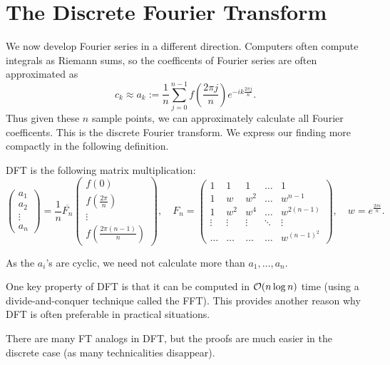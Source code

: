 \section{The Discrete Fourier Transform}
We now develop Fourier series in a different direction. Computers often compute integrals as Riemann sums, so the coefficents of Fourier series are often approximated as
\[
    c_k \approx a_k := \frac{1}{n} \sum^{n-1}_{j=0} f( \frac{2\pi j}{n}) e^{-ik \frac{2\pi j}{n}}.
\]
Thus given these $n$ sample points, we can approximately calculate all Fourier coefficents. This is the discrete Fourier transform. We express our finding more compactly in the following definition.
\begin{dfn}
    DFT is the following matrix multiplication:
    \[
        \begin{pmatrix}
            a_1 \\ a_2 \\ \vdots \\ a_n
        \end{pmatrix}
        =
        \frac{1}{n}
        \overline{F_n}
        \begin{pmatrix}
            f( 0) \\
            f( \frac{2\pi}{n}) \\
            \vdots\\
            f( \frac{2\pi(n-1)}{n})
        \end{pmatrix},
        \quad
        F_n =
        \begin{pmatrix}
            1   &   1   &   1   &   \dots   &   1\\
            1   &   w   &   w^2 &   \dots   &   w^{n-1}\\
            1   &   w^2 &   w^4 &   \dots   &   w^{2(n-1)}\\
            \vdots&\vdots&\vdots& \ddots    & \vdots\\
            \hdots&\hdots&\hdots&\hdots     & w^{(n-1)^2}
        \end{pmatrix},
        \quad
        w = e^{ \frac{2\pi i}{n}}.
    \]
\end{dfn}
\begin{remark}
    As the $a_i$'s are cyclic, we need not calculate more than $a_1, \dots, a_n$.
\end{remark}
One key property of DFT is that it can be computed in ${\mathcal O}(n\log{n})$ time (using a divide-and-conquer technique called the FFT). This provides another reason why DFT is often preferable in practical situations.
\begin{remark}
    There are many FT analogs in DFT, but the proofs are much easier in the discrete case (as many technicalities disappear).
\end{remark}
